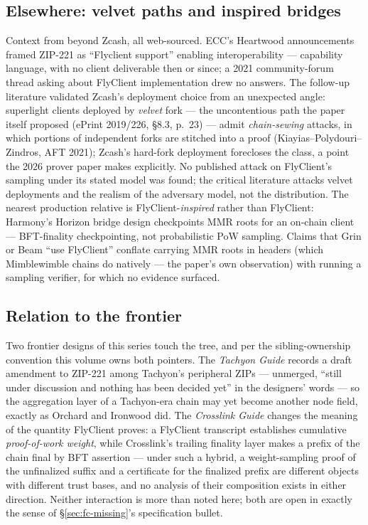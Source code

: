 \documentclass[11pt,a4paper]{article}
\theoremstyle{definition}
\begin{document}
\subsection{Elsewhere: velvet paths and inspired bridges}
\label{sec:fc-elsewhere}

Context from beyond Zcash, all web-sourced. ECC's Heartwood
announcements framed ZIP-221 as ``Flyclient support'' enabling
interoperability --- capability language, with no client deliverable
then or since; a 2021 community-forum thread asking about FlyClient
implementation drew no answers. The follow-up literature validated
Zcash's deployment choice from an unexpected angle: superlight clients
deployed by \emph{velvet} fork --- the uncontentious path the paper
itself proposed (ePrint 2019/226, \S8.3, p.~23) --- admit \emph{chain-sewing}
attacks, in which portions of independent forks are stitched into a
proof (Kiayias--Polydouri--Zindros, AFT 2021); Zcash's hard-fork
deployment forecloses the class, a point the 2026 prover paper makes
explicitly. No published attack on FlyClient's sampling under its
stated model was found; the critical literature attacks velvet
deployments and the realism of the adversary model, not the
distribution. The nearest production relative is
FlyClient-\emph{inspired} rather than FlyClient: Harmony's Horizon
bridge design checkpoints MMR roots for an on-chain client ---
BFT-finality checkpointing, not probabilistic PoW sampling. Claims that
Grin or Beam ``use FlyClient'' conflate carrying MMR roots in headers
(which Mimblewimble chains do natively --- the paper's own observation)
with running a sampling verifier, for which no evidence surfaced.

\subsection{Relation to the frontier}\label{sec:fc-frontier}

Two frontier designs of this series touch the tree, and per the
sibling-ownership convention this volume owns both pointers. The
\emph{Tachyon Guide} records a draft amendment to ZIP-221 among
Tachyon's peripheral ZIPs --- unmerged, ``still under discussion and
nothing has been decided yet'' in the designers' words --- so the
aggregation layer of a Tachyon-era chain may yet become another node
field, exactly as Orchard and Ironwood did. The \emph{Crosslink Guide}
changes the meaning of the quantity FlyClient proves: a FlyClient
transcript establishes cumulative \emph{proof-of-work weight}, while
Crosslink's trailing finality layer makes a prefix of the chain final
by BFT assertion --- under such a hybrid, a weight-sampling proof of
the unfinalized suffix and a certificate for the finalized prefix are
different objects with different trust bases, and no analysis of their
composition exists in either direction. Neither interaction is more
than noted here; both are open in exactly the sense of
\S\ref{sec:fc-missing}'s specification bullet.
\end{document}
